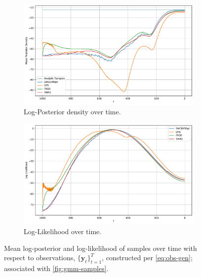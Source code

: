 \begin{figure}[t]
    \centering
    \begin{subfigure}[b]{0.48\textwidth}
      \centering
      \includegraphics[width=\textwidth]{assets/gmm_posterior_densities.pdf}
      \caption{Log-Posterior density over time.}
      \label{fig:gmm-posterior}
    \end{subfigure}
    \hfill
    \begin{subfigure}[b]{0.48\textwidth}
      \centering
      \includegraphics[width=\textwidth]{assets/gmm_log_likelihoods.pdf}
      \caption{Log-Likelihood over time.}
      \label{fig:gmm-log-likelihoods}
    \end{subfigure}
    \caption{Mean log-posterior and log-likelihood of samples over time with respect to
    observations, $\{\mathbf{y}_t\}_{t=1}^T$, constructed per \autoref{eq:obs-gen}; associated with
    \autoref{fig:gmm-samples}.}
    \label{fig:gmm-metrics}
\end{figure}

